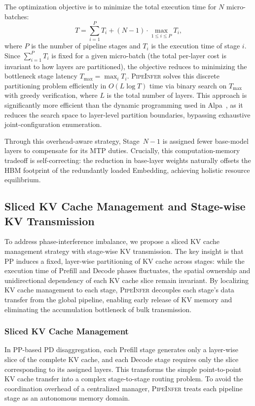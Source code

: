 \documentclass[12pt,a4paper]{article}
\newcommand{\sys}{\textsc{PipeInfer}\xspace}
\newcommand{\Prefillterm}{Prefill\xspace}
\newcommand{\Decodeterm}{Decode\xspace}
\newcommand{\kvcache}{KV cache\xspace}
\newcommand{\phaseimb}{phase-interference imbalance\xspace}
\newcommand{\Slicedkv}{Sliced KV Cache Management\xspace}
\newcommand{\Stagekv}{Stage-wise KV Transmission\xspace}
\begin{document}
The optimization objective is to minimize the total execution time for $N$ micro-batches:
\begin{equation}
T = \sum_{i=1}^{P} T_i + (N-1) \cdot \max_{1 \leq i \leq P} T_i,
\end{equation}
where $P$ is the number of pipeline stages and $T_i$ is the execution time of stage $i$.
Since $\sum_{i=1}^{P} T_i$ is fixed for a given micro-batch (the total per-layer cost is invariant to how layers are partitioned), the objective reduces to minimizing the bottleneck stage latency $T_{\max} = \max_i T_i$.
\sys solves this discrete partitioning problem efficiently in $O(L \log T)$ time via binary search on $T_{\max}$ with greedy verification, where $L$ is the total number of layers.
This approach is significantly more efficient than the dynamic programming used in Alpa~\cite{alpa}, as it reduces the search space to layer-level partition boundaries, bypassing exhaustive joint-configuration enumeration.

Through this overhead-aware strategy, Stage~$N{-}1$ is assigned fewer base-model layers to compensate for its MTP duties.
Crucially, this computation-memory tradeoff is self-correcting: the reduction in base-layer weights naturally offsets the HBM footprint of the redundantly loaded Embedding, achieving holistic resource equilibrium.

\subsection{\Slicedkv and \Stagekv}
\label{sec:kvcache}

To address \phaseimb, we propose a sliced \kvcache management strategy with stage-wise KV transmission.
The key insight is that PP induces a fixed, layer-wise partitioning of \kvcache across stages: while the execution time of \Prefillterm and \Decodeterm phases fluctuates, the spatial ownership and unidirectional dependency of each \kvcache slice remain invariant.
By localizing \kvcache management to each stage, \sys decouples each stage's data transfer from the global pipeline, enabling early release of KV memory and eliminating the accumulation bottleneck of bulk transmission.

\subsubsection{\Slicedkv}

In PP-based PD disaggregation, each \Prefillterm stage generates only a layer-wise slice of the complete \kvcache, and each \Decodeterm stage requires only the slice corresponding to its assigned layers.
This transforms the simple point-to-point \kvcache transfer into a complex stage-to-stage routing problem.
To avoid the coordination overhead of a centralized manager, \sys treats each pipeline stage as an autonomous memory domain.
\end{document}
